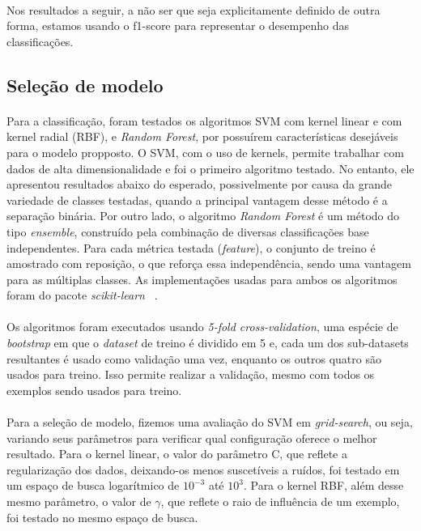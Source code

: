                 \paragraph{} Nos resultados a seguir, a não ser que seja explicitamente definido de outra forma, estamos usando o f1-score para representar o desempenho das classificações.

        \subsection{Seleção de modelo}
        
            \paragraph{} Para a classificação, foram testados os algoritmos SVM com kernel linear e com kernel radial (RBF), e \textit{Random Forest}, por possuírem características desejáveis para o modelo propposto. O SVM, com o uso de kernels, permite trabalhar com dados de alta dimensionalidade e foi o primeiro algoritmo testado. No entanto, ele apresentou resultados abaixo do esperado, possivelmente por causa da grande variedade de classes testadas, quando a principal vantagem desse método é a separação binária. Por outro lado, o algoritmo \textit{Random Forest} é um método do tipo \textit{ensemble}, construído pela combinação de diversas classificações base independentes. Para cada métrica testada (\textit{feature}), o conjunto de treino é amostrado com reposição, o que reforça essa independência, sendo uma vantagem para as múltiplas classes. As implementações usadas para ambos os algoritmos foram do pacote \textit{scikit-learn} ~\cite{scikit}.
            
            \paragraph{} Os algoritmos foram executados usando \textit{5-fold cross-validation}, uma espécie de \textit{bootstrap} em que o \textit{dataset} de treino é dividido em 5 e, cada um dos sub-datasets resultantes é usado como validação uma vez, enquanto os outros quatro são usados para treino. Isso permite realizar a validação, mesmo com todos os exemplos sendo usados para treino. 
            
            \paragraph{} Para a seleção de modelo, fizemos uma avaliação do SVM em \textit{grid-search}, ou seja, variando seus parâmetros para verificar qual configuração oferece o melhor resultado. Para o kernel linear, o valor do parâmetro C, que reflete a regularização dos dados, deixando-os menos suscetíveis a ruídos, foi testado em um espaço de busca logarítmico de $10^{-3}$ até $10^{3}$. Para o kernel RBF, além desse mesmo parâmetro, o valor de $\gamma$, que reflete o raio de influência de um exemplo, foi testado no mesmo espaço de busca.
        
